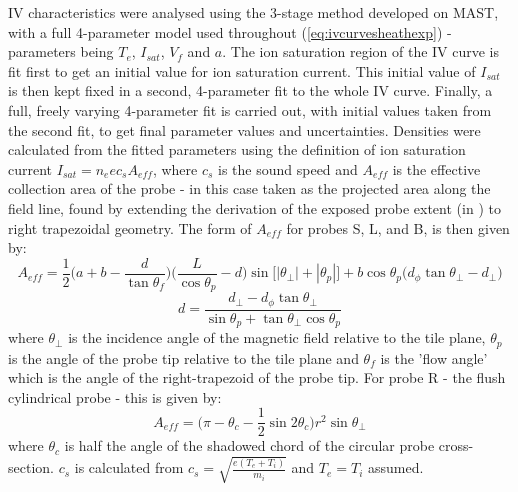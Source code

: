 \documentclass[a4paper, 12pt]{article} %
\begin{document}
	IV characteristics were analysed using the 3-stage method developed on MAST, with a full 4-parameter model used throughout (\cref{eq:ivcurvesheathexp}) - parameters being $T_e$, $I_{sat}$, $V_f$ and $a$.
	The ion saturation region of the IV curve is fit first to get an initial value for ion saturation current.
	This initial value of $I_{sat}$ is then kept fixed in a second, 4-parameter fit to the whole IV curve. 
	Finally, a full, freely varying 4-parameter fit is carried out, with initial values taken from the second fit, to get final parameter values and uncertainties.
	Densities were calculated from the fitted parameters using the definition of ion saturation current $I_{sat} = n_e e c_s A_{eff}$, 
	where $c_s$ is the sound speed and $A_{eff}$ is the effective collection area of the probe - in this case taken as the projected area along the field line, found by extending the derivation of the exposed probe extent (in \cite{Harrison}) to right trapezoidal geometry.
	The form of $A_{eff}$ for probes S, L, and B, is then given by:
	\begin{equation}
    	\label{eq:a_eff_alternate}
    	A_{eff} = \frac{1}{2} \bigg(a + b - \frac{d}{\tan{\theta_{f}}} \bigg)\bigg(\frac{L}{\cos{\theta_{p}}} - d\bigg) \sin{\Big[|\theta_{\perp}| + |\theta_{p}|\Big]} + b \cos{\theta_{p}}\Big(d_{\phi}\tan{\theta_{\perp}} - d_{\perp}\Big)
	\end{equation}
	\begin{equation}
    	\label{eq:d}
    	d = \frac{d_{\perp} - d_{\phi}\tan{\theta_{\perp}}}{ \sin{\theta_{p}} + \tan{\theta_{\perp}}\cos{\theta_{p}}}
	\end{equation}
	where $\theta_{\perp}$ is the incidence angle of the magnetic field relative to the tile plane, $\theta_{p}$ is the angle of the probe tip relative to the tile plane and $\theta_{f}$ is the 'flow angle' which is the angle of the right-trapezoid of the probe tip.
	For probe R - the flush cylindrical probe - this is given by:
	\begin{equation}
        \label{eq:cylinder_A_coll}
        A_{eff} = \bigg(\pi - \theta_{c} - \frac{1}{2}\sin{2\theta_{c}}\bigg) r^2\sin{\theta_{\perp}}
    \end{equation}
	where $\theta_{c}$ is half the angle of the shadowed chord of the circular probe cross-section.
	$c_s$ is calculated from $c_s = \sqrt{\frac{e(T_e + T_i)}{m_i}}$ and $T_e = T_i$ assumed. 
	
\end{document}
